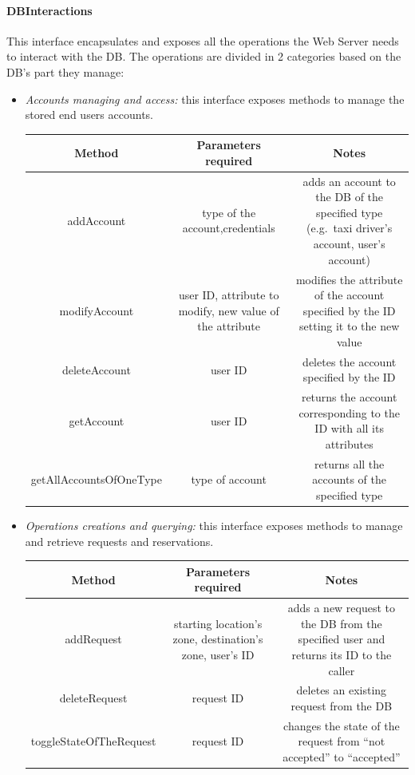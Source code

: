 \documentclass{article}
\begin{document}
\paragraph{DBInteractions}
This interface encapsulates and exposes all the operations the Web Server needs to interact with the DB\@. The operations are divided in 2 categories based on the DB's part they manage:
\begin{itemize}	
	\item \textit{Accounts managing and access:} this interface exposes methods to manage the stored end users accounts.\\	
	
		\centering
		\begin{tabular}{*{3}{c}}
			\toprule
			Method & Parameters required & Notes \\
			\midrule
			addAccount & type of the account,credentials & adds an account to the DB of the specified type (e.g.\ taxi driver's account, user's account) \\
			modifyAccount & user ID, attribute to modify, new value of the attribute & modifies the attribute of the account specified by the ID setting it to the new value\\ 
			deleteAccount & user ID & deletes the account specified by the ID \\
			getAccount & user ID & returns the account corresponding to the ID with all its attributes \\
			getAllAccountsOfOneType & type of account & returns all the accounts of the specified type \\
			\bottomrule
		\end{tabular}	
	\item \textit{Operations creations and querying:} this interface exposes methods to manage and retrieve requests and reservations.\\	
		\begin{tabular}{*{3}{c}}
			\toprule
			Method & Parameters required & Notes \\
			\midrule
			addRequest & starting location's zone, destination's zone, user's ID & adds a new request to the DB from the specified user and returns its ID to the caller\\ 
			deleteRequest & request ID & deletes an existing request from the DB\\ 
			toggleStateOfTheRequest & request ID & changes the state of the request from ``not accepted'' to ``accepted''\\

\end{tabular}
\end{itemize}
\end{document}
